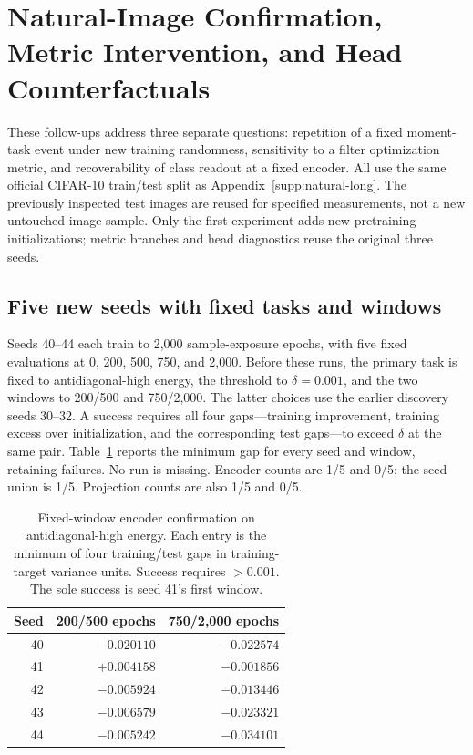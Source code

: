 \section{Natural-Image Confirmation, Metric Intervention, and Head Counterfactuals}
\label{supp:natural-followup}
These follow-ups address three separate questions: repetition of a fixed moment-task event under new training randomness, sensitivity to a filter optimization metric, and recoverability of class readout at a fixed encoder. All use the same official CIFAR-10 train/test split as Appendix~\ref{supp:natural-long}. The previously inspected test images are reused for specified measurements, not a new untouched image sample. Only the first experiment adds new pretraining initializations; metric branches and head diagnostics reuse the original three seeds.

\subsection{Five new seeds with fixed tasks and windows}
Seeds 40--44 each train to 2,000 sample-exposure epochs, with five fixed evaluations at 0, 200, 500, 750, and 2,000. Before these runs, the primary task is fixed to antidiagonal-high energy, the threshold to $\delta=0.001$, and the two windows to 200/500 and 750/2,000. The latter choices use the earlier discovery seeds 30--32. A success requires all four gaps---training improvement, training excess over initialization, and the corresponding test gaps---to exceed $\delta$ at the same pair. Table~\ref{supp:followup-confirmation} reports the minimum gap for every seed and window, retaining failures. No run is missing. Encoder counts are 1/5 and 0/5; the seed union is 1/5. Projection counts are also 1/5 and 0/5.

\begin{table}[t]
\centering\small
\caption{Fixed-window encoder confirmation on antidiagonal-high energy. Each entry is the minimum of four training/test gaps in training-target variance units. Success requires $>0.001$. The sole success is seed 41's first window.}
\label{supp:followup-confirmation}
\begin{tabular}{rrr}
\toprule
Seed&200/500 epochs&750/2,000 epochs\\\midrule
40&$-0.020110$&$-0.022574$\\
41&$+0.004158$&$-0.001856$\\
42&$-0.005924$&$-0.013446$\\
43&$-0.006579$&$-0.023321$\\
44&$-0.005242$&$-0.034101$\\\bottomrule
\end{tabular}
\end{table}

